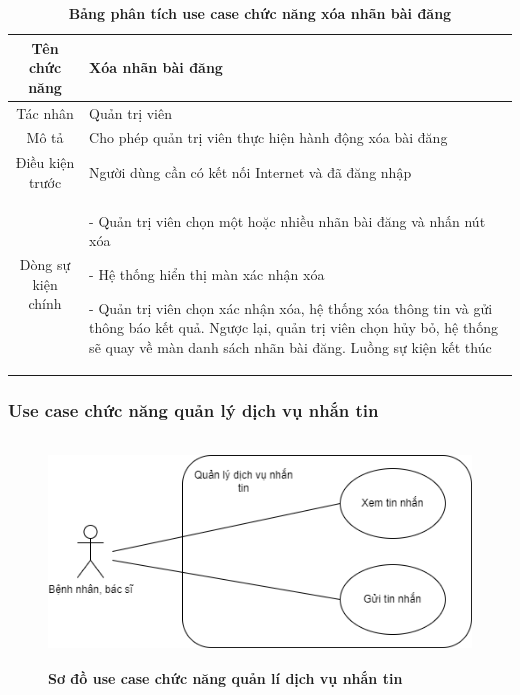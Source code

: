   \begin{table}[H]
    \caption{\bfseries \fontsize{12pt}{0pt}\selectfont Bảng phân tích use case chức năng xóa nhãn bài đăng}
    \centering
    \begin{tabularx}{0.9\textwidth}{|c|X|}
      \hline
      \textbf{Tên chức năng} & \textbf{Xóa nhãn bài đăng} \\
      \hline
      Tác nhân & Quản trị viên \\
      \hline
      Mô tả & Cho phép quản trị viên thực hiện hành động xóa bài đăng \\
      \hline
      Điều kiện trước & Người dùng cần có kết nối Internet và đã đăng nhập \\
      \hline
      Dòng sự kiện chính & 
        - Quản trị viên chọn một hoặc nhiều nhãn bài đăng và nhấn nút xóa

        - Hệ thống hiển thị màn xác nhận xóa

        - Quản trị viên chọn xác nhận xóa, hệ thống xóa thông tin và gửi thông báo kết quả. Ngược lại, quản trị viên 
        chọn hủy bỏ, hệ thống sẽ quay về màn danh sách nhãn bài đăng. Luồng sự kiện kết thúc
        \\
      \hline
    \end{tabularx}
  \end{table}

\subsubsection{Use case chức năng quản lý dịch vụ nhắn tin}
  \begin{figure}[H]
    \centering
    \includegraphics[width=12cm,height=6cm]{Images/use_case/use_case_send_receive_message.png}
    \caption[Sơ đồ use case chức năng quản lí dịch vụ nhắn tin]{\bfseries \fontsize{12pt}{0pt}
    \selectfont Sơ đồ use case chức năng quản lí dịch vụ nhắn tin}
    \label{use_case_chat} %
  \end{figure}

